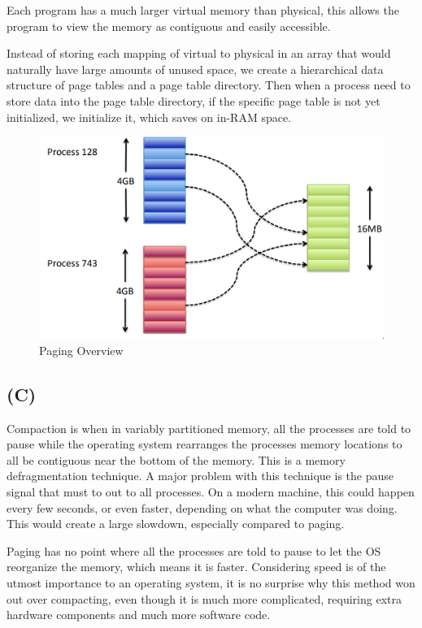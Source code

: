 \documentclass[12pt]{article}
\begin{document}
	Each program has a much larger virtual memory than physical, this allows the program to view the memory as contiguous and easily accessible. 
	
	Instead of storing each mapping of virtual to physical in an array that would naturally have large amounts of unused space, we create a hierarchical data structure of page tables and a page table directory. Then when a process need to store data into the page table directory, if the specific page table is not yet initialized, we initialize it, which saves on in-RAM space.
	
	
	\begin{figure}
		\centering
		\includegraphics[width=\columnwidth]{paging-overview}
		\caption{Paging Overview}
		\label{paging-overview}
	\end{figure}
	
	
	\subsection*{(C)}
	Compaction is when in variably partitioned memory, all the processes are told to pause while the operating system rearranges the processes memory locations to all be contiguous near the bottom of the memory. This is a memory defragmentation technique. A major problem with this technique is the pause signal that must to out to all processes. On a modern machine, this could happen every few seconds, or even faster, depending on what the computer was doing. This would create a large slowdown, especially compared to paging.
	
	Paging has no point where all the processes are told to pause to let the OS reorganize the memory, which means it is faster. Considering speed is of the utmost importance to an operating system, it is no surprise why this method won out over compacting, even though it is much more complicated, requiring extra hardware components and much more software code.
	
\end{document}
